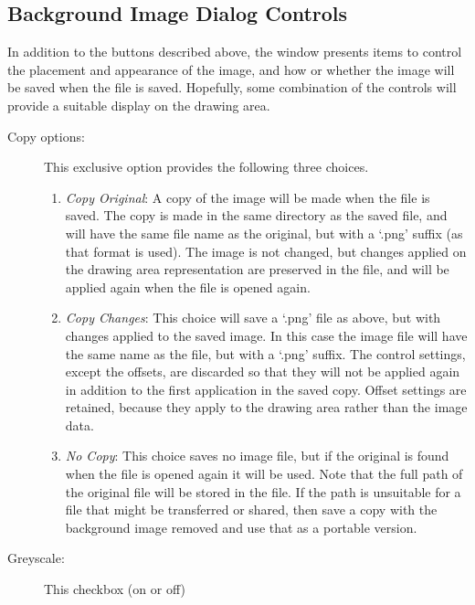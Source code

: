 		\subsection{Background Image Dialog Controls}%
		\label{ssec:bg_image_controls}
		In addition to the buttons described above,
		the   window
		presents items to control the placement and
		appearance of the image, and how or whether
		the image will be saved when the \IXpkg{} file
		is saved. Hopefully, some combination of the
		controls will provide a suitable display on the
		drawing area.

		\begin{description}
		  \item[Copy options:] This exclusive option
		  provides the following three choices.
			\begin{enumerate}
			  \item \emph{Copy Original}: A
			  copy of the image will be made when the
			  \IXpkg{} file is saved. The copy is made in
			  the same directory as the saved \IXpkg{} file,
			  and will have the same file name as the original,
			  but with a
			  `.png' suffix (as that format is used).  The
			  image is not changed, but changes applied on the
			  drawing area representation are preserved in
			  the \IXpkg{} file, and will be applied again when
			  the \IXpkg{} file is opened again.
			  \item \emph{Copy Changes}: This
			  choice will save a `.png'
			  file as above, but with changes applied to
			  the saved image. In this case the image
			  file will have the same name as the \IXpkg{} file,
			  but with a `.png' suffix. The 
			  control settings, except the offsets,
			  are discarded so that they will not be applied
			  again in addition to the first application
			  in the saved copy. Offset settings are retained,
			  because they apply to the drawing area rather
			  than the image data.
			  \item \emph{No Copy}: This choice
			  saves no image file, but if the
			  original is found when the \IXpkg{} file is
			  opened again it will be used. Note that the
			  full path of the original file will be stored
			  in the \IXpkg{} file. If the path is unsuitable
			  for a file that might be transferred or shared,
			  then save a copy with the background image
			  removed and use that as a portable version.
			\end{enumerate}
		  \item[Greyscale:] This checkbox (on or off)

\end{description}
